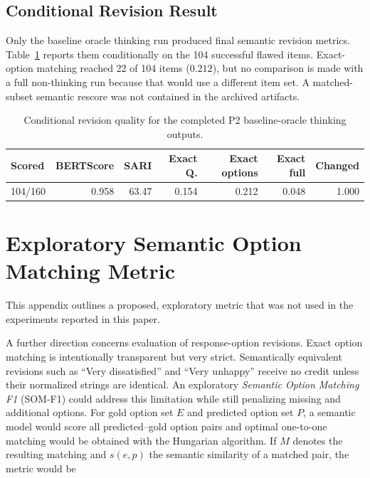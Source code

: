 \documentclass[11pt,a4paper]{article}
\begin{document}
\subsection{Conditional Revision Result}

Only the baseline oracle thinking run produced final semantic revision metrics.
Table~\ref{tab:thinking-conditional-revision} reports them conditionally on the
104 successful flawed items. Exact-option matching reached 22 of 104 items
($0.212$), but no comparison is made with a full non-thinking run because that
would use a different item set. A matched-subset semantic rescore was not
contained in the archived artifacts.

\begin{table}[H]
\centering
\caption{Conditional revision quality for the completed P2 baseline-oracle
         thinking outputs.}
\label{tab:thinking-conditional-revision}
\small
\begin{tabular}{lrrrrrr}
\toprule
\textbf{Scored} & \textbf{BERTScore} & \textbf{SARI}
& \textbf{Exact Q.} & \textbf{Exact options} & \textbf{Exact full}
& \textbf{Changed} \\
\midrule
104/160 & 0.958 & 63.47 & 0.154 & 0.212 & 0.048 & 1.000 \\
\bottomrule
\end{tabular}
\end{table}

\clearpage
\section{Exploratory Semantic Option Matching Metric}
\label{app:som-f1}

This appendix outlines a proposed, exploratory metric that was not used in the
experiments reported in this paper.

A further direction concerns evaluation of response-option revisions. Exact
option matching is intentionally transparent but very strict. Semantically
equivalent revisions such as ``Very dissatisfied'' and ``Very unhappy'' receive
no credit unless their normalized strings are identical. An exploratory
\emph{Semantic Option Matching F1} (SOM-F1) could address this limitation while
still penalizing missing and additional options. For gold option set $E$ and
predicted option set $P$, a semantic model would score all predicted--gold
option pairs and optimal one-to-one matching would be obtained with the
Hungarian algorithm. If $M$ denotes the resulting matching and $s(e,p)$ the
semantic similarity of a matched pair, the metric would be
\end{document}
